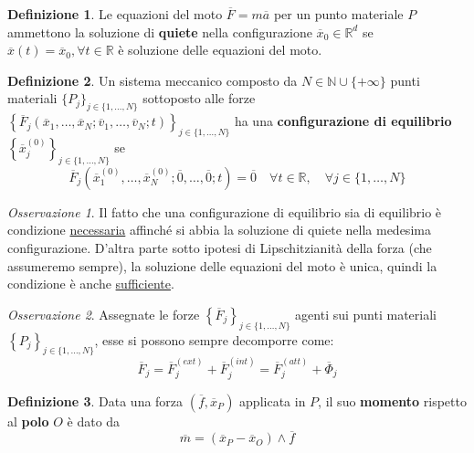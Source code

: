 \documentclass{book}
\theoremstyle{plain}
\theoremstyle{plain}
\theoremstyle{plain}
\theoremstyle{plain}
\theoremstyle{plain}
\theoremstyle{definition}
\newtheorem{defi}{Definizione}[chapter]
\theoremstyle{remark}
\newtheorem*{oss}{Osservazione}
\theoremstyle{definition}
\begin{document}
\begin{defi}
    Le equazioni del moto $\overline{F}=m \overline{a}$ per un punto materiale $P$ ammettono la soluzione di \textbf{quiete} nella configurazione $\overline{x}_{0} \in \mathbb{R}^{d}$ se $\overline{x}(t)=\overline{x}_{0}, \forall t \in \mathbb{R}$ è soluzione delle equazioni del moto.
\end{defi}

\begin{defi}
    Un sistema meccanico composto da $N \in \mathbb{N} \cup \{+\infty\}$ punti materiali $\{P_j\}_{j \in \{1,\ldots,N\}}$ sottoposto alle forze $\left\{\overline{F}_{j}\left(\overline{x}_{1}, \ldots, \overline{x}_{N}; \overline{v}_{1}, \ldots, \overline{v}_{N}; t\right)\right\}_{j \in \{1,\ldots,N\}}$ ha una \textbf{configurazione di equilibrio} $\left\{\overline{x}_j^{(0)}\right\}_{j \in\{1, \ldots, N\}}$ se
    \begin{displaymath}
    \boxed{
        \overline{F}_{j}\left(\overline{x}_{1}^{(0)}, \ldots, \overline{x}_{N}^{(0)}; \overline{0}, \ldots, \overline{0}; t\right)=\overline{0} \quad \forall t \in \mathbb{R}, \quad \forall j \in \{1,\ldots,N\}
        }
    \end{displaymath}
\end{defi}

\begin{oss}
    Il fatto che una configurazione di equilibrio sia di equilibrio è condizione \underline{necessaria} affinché si abbia la soluzione di quiete nella medesima configurazione. D'altra parte sotto ipotesi di Lipschitzianità della forza (che assumeremo sempre), la soluzione delle equazioni del moto è unica, quindi la condizione è anche \underline{sufficiente}.
\end{oss}

\begin{oss}
    Assegnate le forze $\left\{\overline{F}_j\right\}_{j \in\{1, \ldots, N\}}$ agenti sui punti materiali $\left\{P_j\right\}_{j \in\{1, \ldots, N\}}$, esse si possono sempre decomporre come:
   \begin{displaymath}
   \overline{F}_{j}=\overline{F}_{j}^{(ext)}+\overline{F}_{j}^{(int)}=\overline{F}_{j}^{(att)}+\overline{\Phi}_{j}
   \end{displaymath}
\end{oss}

\begin{defi}
    Data una forza $\left(\overline{f}, \overline{x}_{P}\right)$ applicata in $P$, il suo \textbf{momento} rispetto al \textbf{polo} $O$ è dato da
    \begin{displaymath}
        \boxed{
        \overline{m}=\left(\overline{x}_{P}-\overline{x}_{O}\right) \wedge \overline{f}
        }
    \end{displaymath}
\end{defi}
\end{document}
